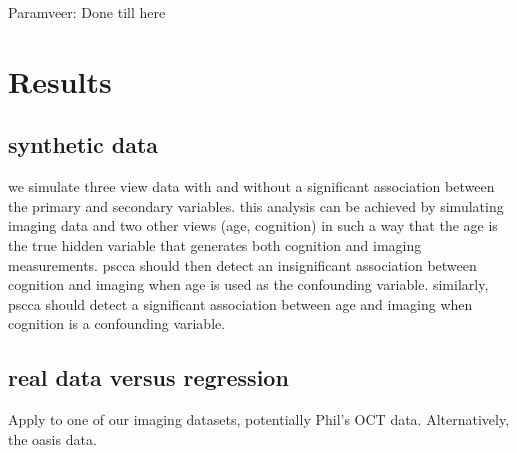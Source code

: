 \documentclass{llncs}
\newcommand{\X}{{\bf X}}
\newcommand{\x}{{\bf x}}
\newcommand{\Y}{{\bf Y}}
\newcommand{\y}{{\bf y}}
\newcommand{\Z}{{\bf Z}}
\begin{document}
 
Paramveer: Done till here
\section{Results}
\subsection{synthetic data}
we simulate three view data with and without a significant association
between the primary and secondary variables.  this analysis can be
achieved by simulating imaging data and two other views (age,
cognition) in such a way that the age is the true hidden variable that
generates both cognition and imaging measurements.  pscca should then
detect an insignificant association between cognition and imaging when
age is used as the confounding variable.  similarly, pscca should
detect a significant association between age and imaging when
cognition is a confounding variable.   

\subsection{real data versus regression}
Apply to one of our imaging datasets, potentially Phil's OCT data.
Alternatively, the oasis data. 
\end{document}
